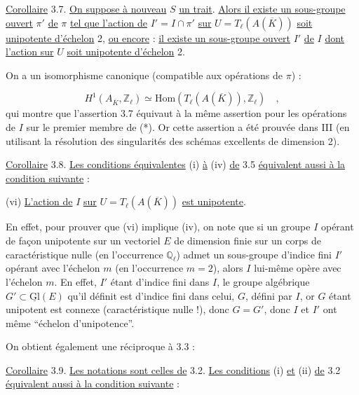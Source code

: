 \underline{Corollaire} 3.7. \underline{On suppose à nouveau} $S$ \underline{un trait}. \underline{Alors il existe un sous-groupe ouvert} $\pi'$ \underline{de} $\pi$ \underline{tel que l'action de} $I' = I \cap \pi'$ \underline{sur} $U = T_\ell(A(\overline{K}))$ \underline{soit unipotente d'échelon} 2, \underline{ou encore} : \underline{il existe un sous-groupe ouvert} $I'$ \underline{de} $I$ \underline{dont l'action sur} $U$ \underline{soit unipotente d'échelon} 2.



On a un isomorphisme canonique (compatible aux opérations de $\pi$) :

\begin{equation}\tag{*}
H^1(A_{\overline{K}}, \mathbb{Z}_\ell) \simeq \mathrm{Hom}(T_\ell(A(\overline{K})), \mathbb{Z}_\ell) \quad ,
\end{equation}
qui montre que l'assertion 3.7 équivaut à la même assertion pour les opérations de $I$ sur le premier membre de (*). Or cette assertion a été prouvée dans III \hspace{2em} (en utilisant la résolution des singularités des schémas excellents de dimension 2).

\underline{Corollaire} 3.8. \underline{Les conditions équivalentes} (i) \underline{à} (iv) \underline{de} 3.5 \underline{équivalent aussi à la condition suivante} :

(vi) \quad \underline{L'action de} $I$ \underline{sur} $U = T_\ell(A(\overline{K}))$ \underline{est unipotente}.

En effet, pour prouver que (vi) implique (iv), on note que si un groupe $I$ opérant de façon unipotente sur un vectoriel $E$ de dimension finie sur un corps de caractéristique nulle (en l'occurrence $\mathbb{Q}_\ell$) admet un sous-groupe d'indice fini $I'$ opérant avec l'échelon $m$ (en l'occurrence $m=2$), alors $I$ lui-même opère avec l'échelon $m$. En effet, $I'$ étant d'indice fini dans $I$, le groupe algébrique $G' \subset \underline{\mathrm{Gl}}(E)$ qu'il définit est d'indice fini dans celui, $G$, défini par $I$, or $G$ étant unipotent est connexe (caractéristique nulle !), donc $G=G'$, donc $I$ et $I'$ ont même ``échelon d'unipotence''.

On obtient également une réciproque à 3.3 :

\underline{Corollaire} 3.9. \underline{Les notations sont celles de} 3.2. \underline{Les conditions} (i) \underline{et} (ii) \underline{de} 3.2 \underline{équivalent aussi à la condition suivante} :

